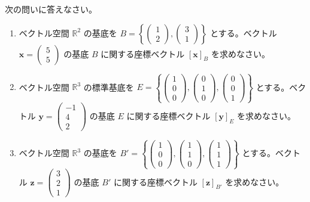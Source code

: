 \begin{quiz}
次の問いに答えなさい。
\begin{enumerate}
\item ベクトル空間 $\mathbb{R}^2$ の基底を $B = \left\{ \begin{pmatrix} 1 \\ 2 \end{pmatrix}, \begin{pmatrix} 3 \\ 1 \end{pmatrix} \right\}$ とする。ベクトル $\bm{x} = \begin{pmatrix} 5 \\ 5 \end{pmatrix}$ の基底 $B$ に関する座標ベクトル $[\bm{x}]_B$ を求めなさい。
\item ベクトル空間 $\mathbb{R}^3$ の標準基底を $E = \left\{ \begin{pmatrix} 1 \\ 0 \\ 0 \end{pmatrix}, \begin{pmatrix} 0 \\ 1 \\ 0 \end{pmatrix}, \begin{pmatrix} 0 \\ 0 \\ 1 \end{pmatrix} \right\}$ とする。ベクトル $\bm{y} = \begin{pmatrix} -1 \\ 4 \\ 2 \end{pmatrix}$ の基底 $E$ に関する座標ベクトル $[\bm{y}]_E$ を求めなさい。
\item ベクトル空間 $\mathbb{R}^3$ の基底を $B' = \left\{ \begin{pmatrix} 1 \\ 0 \\ 0 \end{pmatrix}, \begin{pmatrix} 1 \\ 1 \\ 0 \end{pmatrix}, \begin{pmatrix} 1 \\ 1 \\ 1 \end{pmatrix} \right\}$ とする。ベクトル $\bm{z} = \begin{pmatrix} 3 \\ 2 \\ 1 \end{pmatrix}$ の基底 $B'$ に関する座標ベクトル $[\bm{z}]_{B'}$ を求めなさい。
\end{enumerate}
\end{quiz}


